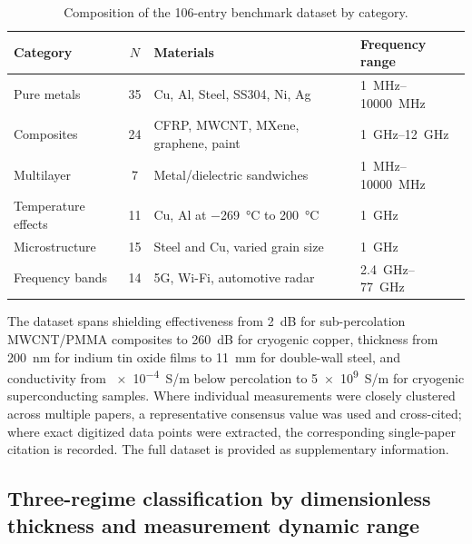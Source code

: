 \documentclass[review,3p,authoryear]{elsarticle}
\begin{document}
\begin{table}[htbp]
\centering
\caption{Composition of the \num{106}-entry benchmark dataset by category.}
\label{tab:benchmark}
\begin{tabular}{@{}lcll@{}}
\toprule
Category & $N$ & Materials & Frequency range \\
\midrule
Pure metals          & 35 & Cu, Al, Steel, SS304, Ni, Ag       & \SIrange{1}{10000}{MHz} \\
Composites           & 24 & CFRP, MWCNT, MXene, graphene, paint& \SIrange{1}{12}{GHz} \\
Multilayer           &  7 & Metal/dielectric sandwiches        & \SIrange{1}{10000}{MHz} \\
Temperature effects  & 11 & Cu, Al at \SI{-269}{\degreeCelsius} to \SI{200}{\degreeCelsius} & \SI{1}{GHz} \\
Microstructure       & 15 & Steel and Cu, varied grain size    & \SI{1}{GHz} \\
Frequency bands      & 14 & 5G, Wi-Fi, automotive radar        & \SIrange{2.4}{77}{GHz} \\
\bottomrule
\end{tabular}
\end{table}

The dataset spans shielding effectiveness from \SI{2}{dB} for sub-percolation MWCNT/PMMA composites to \SI{260}{dB} for cryogenic copper, thickness from \SI{200}{nm} for indium tin oxide films to \SI{11}{mm} for double-wall steel, and conductivity from \SI{e-4}{S/m} below percolation to \SI{5e9}{S/m} for cryogenic superconducting samples. Where individual measurements were closely clustered across multiple papers, a representative consensus value was used and cross-cited; where exact digitized data points were extracted, the corresponding single-paper citation is recorded. The full dataset is provided as supplementary information.

\subsection{Three-regime classification by dimensionless thickness and measurement dynamic range}
\label{sec:regimes}
\end{document}
